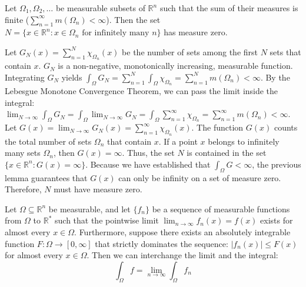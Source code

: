 \begin{lemma}
    Let $\Omega_1, \Omega_2, \dots$ be measurable subsets of $\mathbb{R}^n$ such that the sum of their measures is finite ($\displaystyle\sum_{n=1}^\infty m(\Omega_n) < \infty$). Then the set $N = \{x \in \mathbb{R}^n : x \in \Omega_n \text{ for infinitely many } n\}$ has measure zero.
\end{lemma}
\begin{pfbox}
    Let $G_N(x) = \displaystyle\sum_{n=1}^N \chi_{\Omega_n}(x)$ be the number of sets among the first $N$ sets that contain $x$. $G_N$ is a non-negative, monotonically increasing, measurable function.
    Integrating $G_N$ yields $\int_\Omega G_N = \displaystyle\sum_{n=1}^N \int_\Omega \chi_{\Omega_n} = \displaystyle\sum_{n=1}^N m(\Omega_n) < \infty$.
    By the Lebesgue Monotone Convergence Theorem, we can pass the limit inside the integral: $\displaystyle\lim_{N\to\infty} \int_\Omega G_N = \int_\Omega \lim_{N\to\infty} G_N = \int_\Omega \displaystyle\sum_{n=1}^\infty \chi_{\Omega_n} = \displaystyle\sum_{n=1}^\infty m(\Omega_n) < \infty$.
    Let $G(x) = \displaystyle\lim_{N\to\infty} G_N(x) = \displaystyle\sum_{n=1}^\infty \chi_{\Omega_n}(x)$. The function $G(x)$ counts the total number of sets $\Omega_n$ that contain $x$.
    If a point $x$ belongs to infinitely many sets $\Omega_n$, then $G(x) = \infty$. Thus, the set $N$ is contained in the set $\{x \in \mathbb{R}^n : G(x) = \infty\}$.
    Because we have established that $\int_\Omega G < \infty$, the previous lemma guarantees that $G(x)$ can only be infinity on a set of measure zero. Therefore, $N$ must have measure zero.
\end{pfbox}



\begin{theorem}
    Let $\Omega \subseteq \mathbb{R}^n$ be measurable, and let $\{f_n\}$ be a sequence of measurable functions from $\Omega$ to $\mathbb{R}^*$ such that the pointwise limit $\displaystyle\lim_{n\to\infty} f_n(x) = f(x)$ exists for almost every $x \in \Omega$.
    Furthermore, suppose there exists an absolutely integrable function $F: \Omega \rightarrow [0, \infty]$ that strictly dominates the sequence: $|f_n(x)| \le F(x)$ for almost every $x \in \Omega$. Then we can interchange the limit and the integral:
    $$ \int_\Omega f = \lim_{n\to\infty} \int_\Omega f_n $$
\end{theorem}

